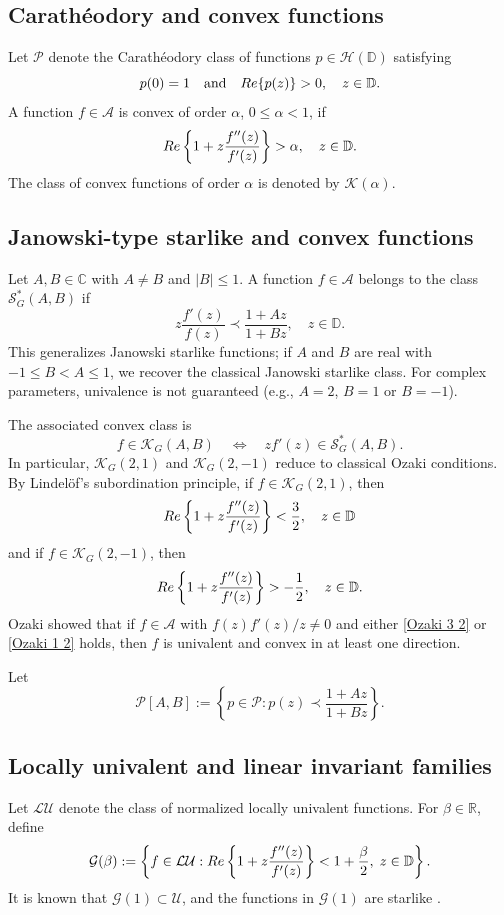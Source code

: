 \documentclass[12pt,a4paper]{amsart}
\numberwithin{equation}{section}
\theoremstyle{remark}
\begin{document}
\subsection*{Carath\'eodory and convex functions}
Let $\mathcal{P}$ denote the Carath\'eodory class of functions $p \in \mathcal{H}(\mathbb{D})$ satisfying
\[
p(0)=1 \quad \text{and} \quad {\rm Re}\{p(z)\}>0, \quad z \in \mathbb{D}.
\]
A function $f \in \mathcal{A}$ is convex of order $\alpha$, $0 \le \alpha < 1$, if
\[
{\rm Re} \left\{ 1 + z \frac{f''(z)}{f'(z)} \right\} > \alpha, \quad z \in \mathbb{D}.
\]
The class of convex functions of order $\alpha$ is denoted by $\mathcal{K}(\alpha)$.

\subsection*{Janowski-type starlike and convex functions}
Let $A,B \in \mathbb{C}$ with $A\neq B$ and $|B|\le 1$. A function $f \in \mathcal{A}$ belongs to the class $\mathcal{S}^*_G(A,B)$ if
\[
z \frac{f'(z)}{f(z)} \prec \frac{1+Az}{1+Bz}, \quad z \in \mathbb{D}.
\]
This generalizes Janowski starlike functions; if $A$ and $B$ are real with $-1 \le B < A \le 1$, we recover the classical Janowski starlike class. For complex parameters, univalence is not guaranteed (e.g., $A=2$, $B=1$ or $B=-1$).  

The associated convex class is
\[
f \in \mathcal{K}_G(A,B) \quad \Longleftrightarrow \quad z f'(z) \in \mathcal{S}^*_G(A,B).
\]
In particular, $\mathcal{K}_G(2,1)$ and $\mathcal{K}_G(2,-1)$ reduce to classical Ozaki conditions. By Lindel\"of's subordination principle, if $f \in \mathcal{K}_G(2,1)$, then
\begin{equation}\label{Ozaki 3 2}
{\rm Re}\left\{ 1 + z \frac{f''(z)}{f'(z)} \right\} < \frac{3}{2}, \quad z \in \mathbb{D}
\end{equation}
and if $f \in \mathcal{K}_G(2,-1)$, then
\begin{equation}\label{Ozaki 1 2}
{\rm Re}\left\{ 1 + z \frac{f''(z)}{f'(z)} \right\} > -\frac{1}{2}, \quad z \in \mathbb{D}.
\end{equation}
Ozaki \cite{Ozaki} showed that if $f \in \mathcal{A}$ with $f(z)f'(z)/z \neq 0$ and either \eqref{Ozaki 3 2} or \eqref{Ozaki 1 2} holds, then $f$ is univalent and convex in at least one direction.  

Let
\[
\mathcal{P}[A,B] := \left\{ p \in \mathcal{P} : p(z) \prec \frac{1+Az}{1+Bz} \right\}.
\]

\subsection*{Locally univalent and linear invariant families}
Let $\mathcal{LU}$ denote the class of normalized locally univalent functions. For $\beta \in \mathbb{R}$, define
\[
\mathcal{G}(\beta) := \left\{ f \in \mathcal{LU} : {\rm Re} \left\{ 1 + z \frac{f''(z)}{f'(z)} \right\} < 1 + \frac{\beta}{2}, \; z \in \mathbb{D} \right\}.
\]
It is known that $\mathcal{G}(1) \subset \mathcal{U}$, and the functions in $\mathcal{G}(1)$ are starlike \cite{KargarJMAA,OPW}.
\end{document}
